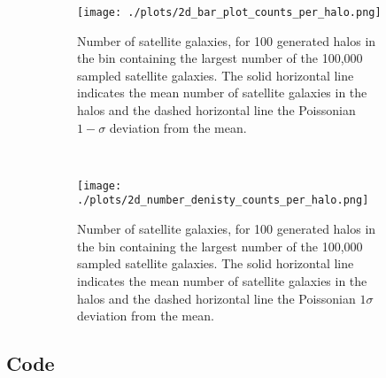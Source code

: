 \begin{figure}[ht!]
  \centering
  \begin{subfigure}[b]{0.49\textwidth}
    
    \texttt{[image: ./plots/2d\_bar\_plot\_counts\_per\_halo.png]}
    \caption{Number of satellite galaxies, for 100 generated halos in the bin containing the largest number of the 100,000 sampled satellite galaxies. The solid horizontal line indicates the mean number of satellite galaxies in the halos and the dashed horizontal line the Poissonian $1-\sigma$ deviation from the mean.}
    \label{fig:2d1}
  \end{subfigure}
    ~
  \begin{subfigure}[b]{0.49\textwidth}
    \texttt{[image: ./plots/2d\_number\_denisty\_counts\_per\_halo.png]}
    \caption{Number of satellite galaxies, for 100 generated halos in the bin containing the largest number of the 100,000 sampled satellite galaxies. The solid horizontal line indicates the mean number of satellite galaxies in the halos and the dashed horizontal line the Poissonian $1\sigma$ deviation from the mean.}
    \label{fig:2d1}
  \end{subfigure}
  \caption{}
\end{figure}

\newpage

\subsection*{Code}




\newpage
